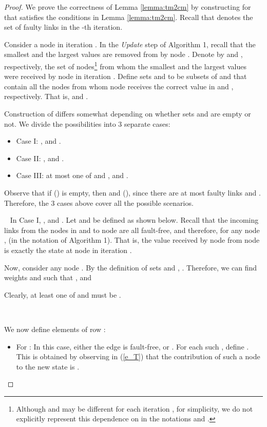 \documentclass{llncs}
\begin{document}
\begin{proof}

We prove the correctness of Lemma \ref{lemma:tm2cm} by constructing  for  that satisfies the conditions in Lemma \ref{lemma:tm2cm}. Recall that  denotes the set of faulty links in the -th iteration.

Consider a node  in iteration . In the {\em Update} step of Algorithm 1, recall that the smallest and the largest  values are removed from  by node . Denote by  and , respectively, the set of nodes\footnote{Although  and  may be different for each iteration , for simplicity, we do not explicitly represent this dependence on  in the notations  and .} from whom the smallest and the largest  values were received by node  in iteration . Define sets  and  to be subsets of  and  that contain all the nodes from whom node  receives the correct value in  and , respectively. That is,  and .

Construction of  differs somewhat depending on whether
sets  and  are empty or not.
We divide the possibilities into 3 separate cases:

\begin{itemize}
\item Case I: , and .

\item Case II: , and .

\item Case III: at most one of  and , and .

\end{itemize}
Observe that if  () is empty, then  and  (), since there are at most  faulty links and . Therefore, the 3 cases above cover all the possible scenarios.



~
In Case I,
, and . Let  and  be defined as shown below. Recall that the incoming links from the nodes in  and  to node  are all fault-free, and therefore, for any node ,  (in the notation of Algorithm 1). That is, the value received by node  from node  is exactly the state at node  in iteration .


Now, consider any node . By the definition of sets  and ,
. Therefore, we can find weights  and  such that , and


Clearly, at least one of  and  must be .

~


We now define elements  of row :

\begin{itemize}
\item For  : In this case, either the edge  is fault-free, or .
For each such , define . This is obtained by observing
in (\ref{e_T}) that the contribution of such a node  to the new state
 is .


\end{itemize}
\end{proof}
\end{document}
